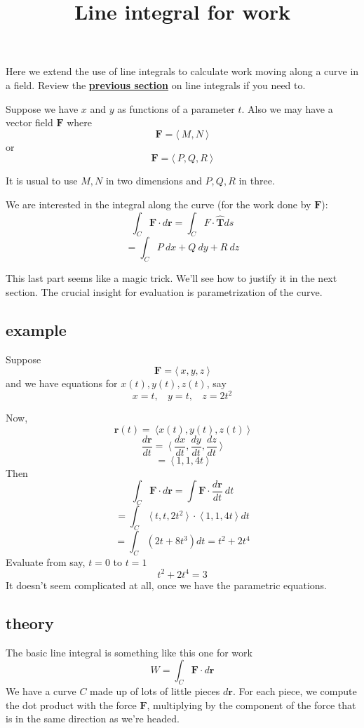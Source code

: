 \documentclass[11pt, oneside]{article}   	%
\title{Line integral for work}
\date{}
\begin{document}
\maketitle
\Large

Here we extend the use of line integrals to calculate work moving along a curve in a field.  Review the \hyperref[sec:line_integrals]{\textbf{previous section}} on line integrals if you need to.

Suppose we have $x$ and $y$ as functions of a parameter $t$.  Also we may have a vector field $\mathbf{F}$ where
\[ \mathbf{F} = \langle \ M,N \ \rangle \]
or
\[ \mathbf{F} = \langle \ P,Q,R \ \rangle \]

It is usual to use $M,N$ in two dimensions and $P,Q,R$ in three.

We are interested in the integral along the curve (for the work done by $\mathbf{F}$):
\[ \int_C \mathbf{F} \cdot d\mathbf{r} = \int_C F \cdot \hat{\mathbf{T}} ds \]
\[ = \int_C P \ dx + Q \ dy + R \ dz \]

This last part seems like a magic trick.  We'll see how to justify it in the next section.  The crucial insight for evaluation is parametrization of the curve.  

\subsection*{example}

Suppose
\[ \mathbf{F} = \langle \ x,y,z \ \rangle \]
and we have equations for $x(t), y(t), z(t)$, say
\[ x = t, \ \ \ \ y = t, \ \ \ \ z = 2t^2 \]

Now,
\[ \mathbf{r}(t) = \ \langle x(t), y(t), z(t) \ \rangle \]
\[\frac{d\mathbf{r}}{dt} = \ \langle \ \frac{dx}{dt},\frac{dy}{dt},\frac{dz}{dt} \ \rangle \]
\[ = \ \langle \ 1,1,4t \ \rangle \]
Then
\[ \int_C \mathbf{F} \cdot d \mathbf{r} = \int \mathbf{F} \cdot \frac{d\mathbf{r}}{dt} \ dt \]
\[ = \int_C \ \langle \ t,t,2t^2 \ \rangle \  \cdot \ \langle \ 1,1,4t \ \rangle \ dt \]
\[ = \int_C (2t + 8t^3) dt = t^2 + 2t^4 \]
Evaluate from say, $t=0$ to $t=1$
\[  t^2 + 2t^4 = 3 \]
It doesn't seem complicated at all, once we have the parametric equations.

\subsection*{theory}

The basic line integral is something like this one for work
\[ W = \int_C \mathbf{F} \cdot d\mathbf{r} \]
We have a curve $C$ made up of lots of little pieces $d\mathbf{r}$.  For each piece, we compute the dot product with the force $\mathbf{F}$, multiplying by the component of the force that is in the same direction as we're headed.  
\end{document}
